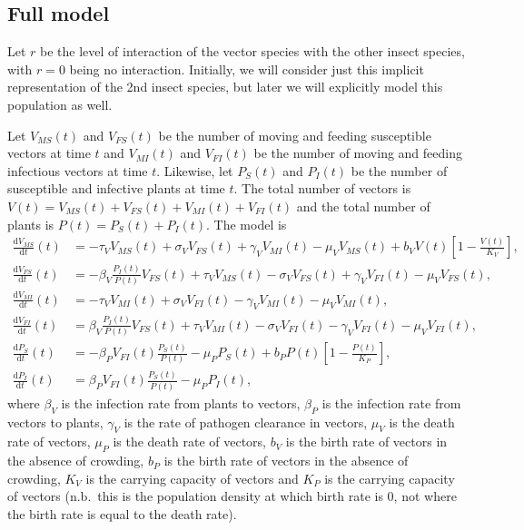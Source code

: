 \documentclass{article}
\newcommand{\md}{\mathrm{d}}
\begin{document}
\subsection{Full model}

Let $r$ be the level of interaction of the vector species with the
other insect species, with $r = 0$ being no interaction.  Initially,
we will consider just this implicit representation of the 2nd insect
species, but later we will explicitly model this population as well.

Let $V_{MS}(t)$ and $V_{FS}(t)$ be the number of moving and feeding
susceptible vectors at time $t$ and $V_{MI}(t)$ and $V_{FI}(t)$ be the
number of moving and feeding infectious vectors at time $t$.
Likewise, let $P_S(t)$ and $P_I(t)$ be the number of susceptible and
infective plants at time $t$.  The total number of vectors is
$V(t) = V_{MS}(t) + V_{FS}(t) + V_{MI}(t) + V_{FI}(t)$ and the total
number of plants is $P(t) = P_S(t) + P_I(t)$.  The model is
\begin{equation}
  \label{odesystemdimensional}
  \begin{split}
    \frac{\md V_{MS}}{\md t}(t)
    &=
    - \tau_V V_{MS}(t)
    + \sigma_V V_{FS}(t)
    + \gamma_V V_{MI}(t)
    - \mu_V V_{MS}(t)
    + b_V V(t) \left[1 - \frac{V(t)}{K_V}\right],
    \\
    \frac{\md V_{FS}}{\md t}(t)
    &= - \beta_V \frac{P_I(t)}{P(t)} V_{FS}(t)
    + \tau_V V_{MS}(t)
    - \sigma_V V_{FS}(t)
    + \gamma_V V_{FI}(t)
    - \mu_V V_{FS}(t),
    \\
    \frac{\md V_{MI}}{\md t}(t)
    &=
    - \tau_V V_{MI}(t)
    + \sigma_V V_{FI}(t)
    - \gamma_V V_{MI}(t)
    - \mu_V V_{MI}(t),
    \\
    \frac{\md V_{FI}}{\md t}(t)
    &=
    \beta_V \frac{P_I(t)}{P(t)} V_{FS}(t)
    + \tau_V V_{MI}(t)
    - \sigma_V V_{FI}(t)
    - \gamma_V V_{FI}(t)
    - \mu_V V_{FI}(t),
    \\
    \frac{\md P_S}{\md t}(t)
    &= - \beta_P V_{FI}(t) \frac{P_S(t)}{P(t)}
    - \mu_P P_S(t)
    + b_P P(t) \left[1 - \frac{P(t)}{K_P}\right],
    \\
    \frac{\md P_I}{\md t}(t)
    &= \beta_P V_{FI}(t) \frac{P_S(t)}{P(t)}
    - \mu_P P_I(t),
  \end{split}
\end{equation}
where $\beta_V$ is the infection rate from plants to vectors,
$\beta_P$ is the infection rate from vectors to plants, $\gamma_V$ is
the rate of pathogen clearance in vectors, $\mu_V$ is the death rate
of vectors, $\mu_P$ is the death rate of vectors, $b_V$ is the birth
rate of vectors in the absence of crowding, $b_P$ is the birth rate of
vectors in the absence of crowding, $K_V$ is the carrying capacity of
vectors and $K_P$ is the carrying capacity of vectors (n.b.~this is
the population density at which birth rate is $0$, not where the birth
rate is equal to the death rate).
\end{document}
